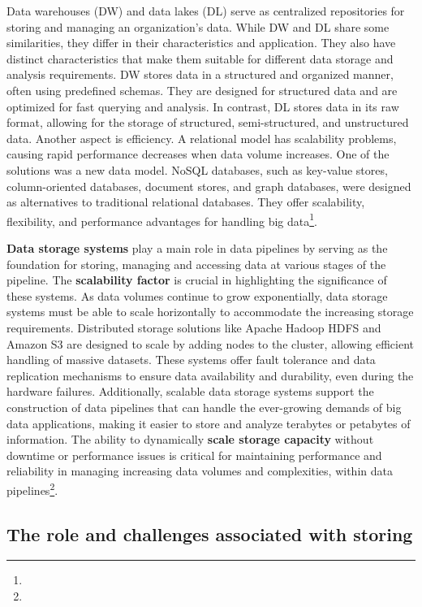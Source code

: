 Data warehouses (DW) and data lakes (DL) serve as centralized repositories for storing and managing an organization's data\footnotemark[20]. While DW and DL share some similarities, they differ in their characteristics and application. They also have distinct characteristics that make them suitable for different data storage and analysis requirements\footnotemark[20].  DW stores data in a structured and organized manner, often using predefined schemas. They are designed for structured data and are optimized for fast querying and analysis. In contrast, DL stores data in its raw format, allowing for the storage of structured, semi-structured, and unstructured data\footnotemark[20]. Another aspect is efficiency.  A relational model has scalability problems, causing rapid performance decreases when data volume increases. One of the solutions was a new data model. NoSQL databases, such as key-value stores, column-oriented databases, document stores, and graph databases, were designed as alternatives to traditional relational databases. They offer scalability, flexibility, and performance advantages for handling big data\footnote[21]{}.

\textbf{Data storage systems} play a main role in data pipelines by serving as the foundation for storing, managing and accessing data at various stages of the pipeline. The \textbf{scalability factor} is crucial in highlighting the significance of these systems. As data volumes continue to grow exponentially, data storage systems must be able to scale horizontally to accommodate the increasing storage requirements. Distributed storage solutions like Apache Hadoop HDFS and Amazon S3 are designed to scale by adding nodes to the cluster, allowing efficient handling of massive datasets. These systems offer fault tolerance and data replication mechanisms to ensure data availability and durability, even during the hardware failures. Additionally, scalable data storage systems support the construction of data pipelines that can handle the ever-growing demands of big data applications, making it easier to store and analyze terabytes or petabytes of information. The ability to dynamically \textbf{scale storage capacity} without downtime or performance issues is critical for maintaining performance and reliability in managing increasing data volumes and complexities, within data pipelines\footnote[20]{}.

\subsection{The role and challenges associated with storing}

